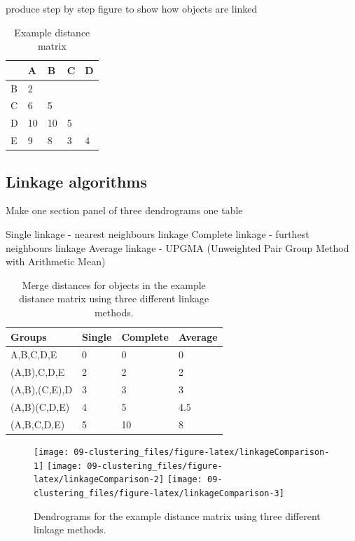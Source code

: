 \documentclass[]{book}
\theoremstyle{definition}
\theoremstyle{definition}
\theoremstyle{definition}
\theoremstyle{remark}
\begin{document}
produce step by step figure to show how objects are linked

\begin{table}

\caption{\label{tab:distance-matrix}Example distance matrix}
\centering
\begin{tabular}[t]{lllll}
\toprule
  & A & B & C & D\\
\midrule
B & 2 &  &  & \\
C & 6 & 5 &  & \\
D & 10 & 10 & 5 & \\
E & 9 & 8 & 3 & 4\\
\bottomrule
\end{tabular}
\end{table}

\subsection{Linkage algorithms}\label{linkage-algorithms}

Make one section panel of three dendrograms one table

Single linkage - nearest neighbours linkage Complete linkage - furthest
neighbours linkage Average linkage - UPGMA (Unweighted Pair Group Method
with Arithmetic Mean)

\begin{table}

\caption{\label{tab:distance-merge}Merge distances for objects in the example distance matrix using three different linkage methods.}
\centering
\begin{tabular}[t]{llll}
\toprule
Groups & Single & Complete & Average\\
\midrule
A,B,C,D,E & 0 & 0 & 0\\
(A,B),C,D,E & 2 & 2 & 2\\
(A,B),(C,E),D & 3 & 3 & 3\\
(A,B)(C,D,E) & 4 & 5 & 4.5\\
(A,B,C,D,E) & 5 & 10 & 8\\
\bottomrule
\end{tabular}
\end{table}

\begin{figure}

{\centering \texttt{[image: 09-clustering\_files/figure-latex/linkageComparison-1]} \texttt{[image: 09-clustering\_files/figure-latex/linkageComparison-2]} \texttt{[image: 09-clustering\_files/figure-latex/linkageComparison-3]} 

}

\caption{Dendrograms for the example distance matrix using three different linkage methods. }\label{fig:linkageComparison}
\end{figure}
\end{document}
